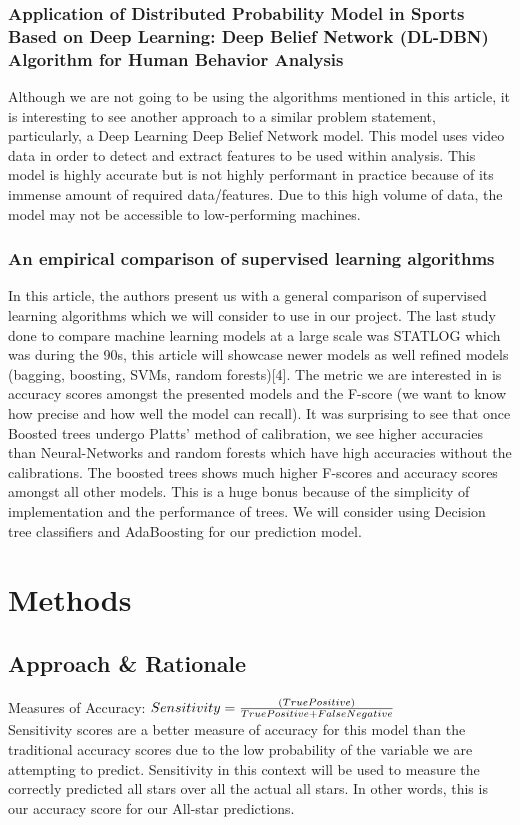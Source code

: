 \documentclass{article}
\begin{document}
\subsubsection*{Application of Distributed Probability Model in Sports Based on Deep Learning: Deep Belief Network (DL-DBN) Algorithm for Human Behavior Analysis}
Although we are not going to be using the algorithms mentioned in this article, it is interesting to see another approach to a similar problem statement, particularly, a Deep Learning Deep Belief Network model. This model uses video data in order to detect and extract features to be used within analysis. This model is highly accurate but is not highly performant in practice because of its immense amount of required data/features. Due to this high volume of data, the model may not be accessible to low-performing machines. 

\subsubsection*{An empirical comparison of supervised learning algorithms}
In this article, the authors present us with a general comparison of supervised learning algorithms which we will consider to use in our project. The last study done to compare machine learning models at a large scale was STATLOG which was during the 90s, this article will showcase newer models as well refined models (bagging, boosting, SVMs, random forests)[4]. The metric we are interested in is accuracy scores amongst the presented models and the F-score (we want to know how precise and how well the model can recall). It was surprising to see that once Boosted trees undergo Platts' method of calibration, we see higher accuracies than Neural-Networks and random forests which have high accuracies without the calibrations. The boosted trees shows much higher F-scores and accuracy scores amongst all other models. This is a huge bonus because of the simplicity of implementation and the performance of trees. We will consider using Decision tree classifiers and AdaBoosting for our prediction model.  

\section{Methods}
\subsection{Approach \& Rationale}
\paragraph{}
Measures of Accuracy: 
\(Sensitivity = {(True Positive) \over{True Positive + False Negative}}\) \\
 Sensitivity scores are a better measure of accuracy for this model than the traditional accuracy scores due to the low probability of the variable we are attempting to predict. Sensitivity in this context will be used to measure the correctly predicted all stars over all the actual all stars. In other words, this is our accuracy score for our All-star predictions.
\end{document}

